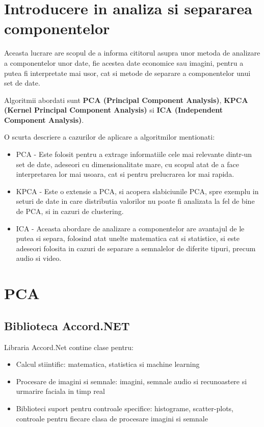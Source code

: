 \documentclass[12pt,oneside]{article}
\begin{document}
\pagestyle{plain}

\newpage
\setcounter{page}{1}
\tableofcontents
\clearpage
\setcounter{page}{1}

\newpage
{}

\pagestyle{plain}
\section{Introducere in analiza si separarea componentelor}
Aceasta lucrare are scopul de a informa cititorul asupra unor metoda de analizare a componentelor unor date, fie acestea date economice sau imagini, pentru a putea fi interpretate mai usor, cat si metode de separare a componentelor unui set de date. 

Algoritmii abordati sunt \textbf{PCA (Principal Component Analysis)}, \textbf{KPCA (Kernel Principal Component Analysis)} si \textbf{ICA (Independent Component Analysis)}. 

O scurta descriere a cazurilor de aplicare a algoritmilor mentionati:
\begin{itemize}
	\item{PCA - Este folosit pentru a extrage informatiile cele mai relevante dintr-un set de date, adeseori cu dimensionalitate mare, cu scopul atat de a face interpretarea lor mai usoara, cat si pentru prelucrarea lor mai rapida.}
	\item{KPCA - Este o extensie a PCA, si acopera slabiciunile PCA, spre exemplu in seturi de date in care distributia valorilor nu poate fi analizata la fel de bine de PCA, si in cazuri de clustering.}
	\item{ICA - Aceasta abordare de analizare a componentelor are avantajul de le putea si separa, folosind atat unelte matematica cat si statistice, si este adeseori folosita in cazuri de separare a semnalelor de diferite tipuri, precum audio si video.}
\end{itemize}

\newpage

\section{PCA}
\subsection{Biblioteca Accord.NET}
Libraria Accord.Net contine clase pentru:
\begin{itemize}
\item Calcul stiintific: matematica, statistica si machine learning
\item Procesare de imagini si semnale: imagini, semnale audio si recunoastere si urmarire faciala in timp real
\item Biblioteci suport pentru controale specifice: histograme, scatter-plots, controale pentru fiecare clasa de procesare imagini si semnale
\end{itemize}
\end{document}
